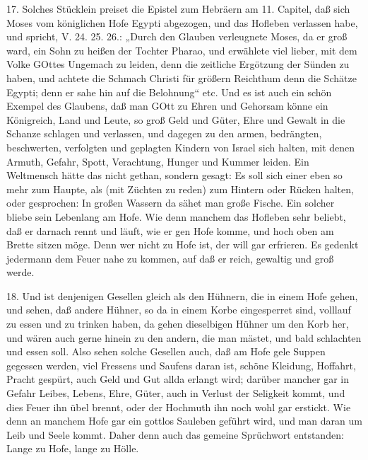 17. Solches Stücklein preiset die Epistel zum Hebräern am 11. Capitel, daß sich Moses vom königlichen Hofe Egypti abgezogen, und das Hofleben verlassen habe, und spricht, V. 24. 25. 26.: „Durch den Glauben verleugnete Moses, da er groß ward, ein Sohn zu heißen der Tochter Pharao, und erwählete viel lieber, mit dem Volke GOttes Ungemach zu leiden, denn die zeitliche Ergötzung der Sünden zu haben, und achtete die Schmach Christi für größern Reichthum denn die Schätze Egypti; denn er sahe hin auf die Belohnung“ etc. Und es ist auch ein schön Exempel des Glaubens, daß man GOtt zu Ehren und Gehorsam könne ein Königreich, Land und Leute, so groß Geld und Güter, Ehre und Gewalt in die Schanze schlagen und verlassen, und dagegen zu den armen, bedrängten, beschwerten, verfolgten und geplagten Kindern von Israel sich halten, mit denen Armuth, Gefahr, Spott, Verachtung, Hunger und Kummer leiden. Ein Weltmensch hätte das nicht gethan, sondern gesagt: Es soll sich einer eben so mehr zum Haupte, als (mit Züchten zu reden) zum Hintern oder Rücken halten, oder gesprochen: In großen Wassern da sähet man große Fische. Ein solcher bliebe sein Lebenlang am Hofe. Wie denn manchem das Hofleben sehr beliebt, daß er darnach rennt und läuft, wie er gen Hofe komme, und hoch oben am Brette sitzen möge. Denn wer nicht zu Hofe ist, der will gar erfrieren. Es gedenkt jedermann dem Feuer nahe zu kommen, auf daß er reich, gewaltig und groß werde.

18. Und ist denjenigen Gesellen gleich als den Hühnern, die in einem Hofe gehen, und sehen, daß andere Hühner, so da in einem Korbe eingesperret sind, volllauf zu essen und zu trinken haben, da gehen dieselbigen Hühner um den Korb her, und wären auch gerne hinein zu den andern, die man mästet, und bald schlachten und essen soll. Also sehen solche Gesellen auch, daß am Hofe gele Suppen gegessen werden, viel Fressens und Saufens daran ist, schöne Kleidung, Hoffahrt, Pracht gespürt, auch Geld und Gut allda erlangt wird; darüber mancher
gar in Gefahr Leibes, Lebens, Ehre, Güter, auch in Verlust der Seligkeit kommt, und dies Feuer ihn übel brennt, oder der Hochmuth ihn noch wohl gar erstickt. Wie denn an manchem Hofe gar ein gottlos Sauleben geführt wird, und man daran um Leib und Seele kommt. Daher denn auch das gemeine Sprüchwort entstanden: Lange zu Hofe, lange zu Hölle.

